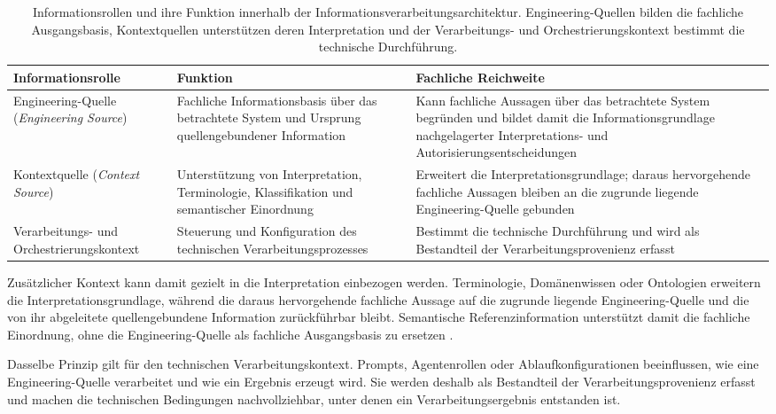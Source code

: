 \begin{table}[htbp]
\centering
\caption[Informationsrollen der Informationsverarbeitungsarchitektur]{
Informationsrollen und ihre Funktion innerhalb der
Informationsverarbeitungsarchitektur. Engineering-Quellen bilden die
fachliche Ausgangsbasis, Kontextquellen unterstützen deren Interpretation
und der Verarbeitungs- und Orchestrierungskontext bestimmt die technische
Durchführung.}
\label{tab:information_authority_roles}
\small
\begin{tabular}{p{} p{} p{}}
\hline
\textbf{Informationsrolle} &
\textbf{Funktion} &
\textbf{Fachliche Reichweite} \\
\hline

Engineering-Quelle
(\emph{Engineering Source}) &
Fachliche Informationsbasis über das betrachtete System und Ursprung
quellengebundener Information &
Kann fachliche Aussagen über das betrachtete System begründen und bildet
damit die Informationsgrundlage nachgelagerter Interpretations- und
Autorisierungsentscheidungen \\

Kontextquelle
(\emph{Context Source}) &
Unterstützung von Interpretation, Terminologie, Klassifikation und
semantischer Einordnung &
Erweitert die Interpretationsgrundlage; daraus hervorgehende fachliche
Aussagen bleiben an die zugrunde liegende Engineering-Quelle gebunden \\

Verarbeitungs- und
Orchestrierungskontext &
Steuerung und Konfiguration des technischen Verarbeitungsprozesses &
Bestimmt die technische Durchführung und wird als Bestandteil der
Verarbeitungsprovenienz erfasst \\
\hline
\end{tabular}
\end{table}

Zusätzlicher Kontext kann damit gezielt in die Interpretation einbezogen
werden. Terminologie, Domänenwissen oder Ontologien erweitern die
Interpretationsgrundlage, während die daraus hervorgehende fachliche Aussage
auf die zugrunde liegende Engineering-Quelle und die von ihr abgeleitete
quellengebundene Information zurückführbar bleibt. Semantische
Referenzinformation unterstützt damit die fachliche Einordnung, ohne die
Engineering-Quelle als fachliche Ausgangsbasis zu ersetzen
\cite{Abonyi.2024,Chis.2025}.

Dasselbe Prinzip gilt für den technischen Verarbeitungskontext. Prompts,
Agentenrollen oder Ablaufkonfigurationen beeinflussen, wie eine
Engineering-Quelle verarbeitet und wie ein Ergebnis erzeugt wird. Sie werden
deshalb als Bestandteil der Verarbeitungsprovenienz erfasst und machen die
technischen Bedingungen nachvollziehbar, unter denen ein
Verarbeitungsergebnis entstanden ist.

